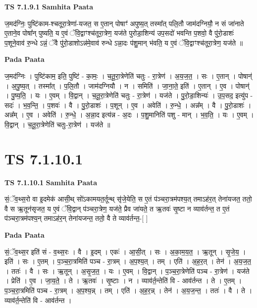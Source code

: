 \documentclass[17pt]{extarticle}
\begin{document}
\textbf{TS 7.1.9.1 } \newline
\textbf{Samhita Paata} \newline

ज॒मद॑ग्निः॒ पुष्टि॑काम-श्चतूरा॒त्रेणा॑-यजत॒ स ए॒तान् पोषाꣳ॑ अपुष्य॒त् तस्मा᳚त् पलि॒तौ जाम॑दग्नियौ॒ न सं जा॑नाते ए॒ताने॒व पोषा᳚न् पुष्यति॒ य ए॒वं ॅवि॒द्वाꣳश्च॑तूरा॒त्रेण॒ यज॑ते पुरोडा॒शिन्य॑ उप॒सदो॑ भवन्ति प॒शवो॒ वै पु॑रो॒डाशः॑ प॒शूने॒वाव॑ रु॒न्धे ऽन्नं॒ ॅवै पु॑रो॒डाशोऽन्न॑मे॒वाव॑ रुन्धे ऽन्ना॒दः प॑शु॒मान् भ॑वति॒ य ए॒वं ॅवि॒द्वाꣳश्च॑तूरा॒त्रेण॒ यज॑ते ॥ \newline

\textbf{Pada Paata} \newline

ज॒मद॑ग्निः । पुष्टि॑काम॒ इति॒ पुष्टि॑ - का॒मः॒ । च॒तू॒रा॒त्रेणेति॑ चतुः - रा॒त्रेण॑ । अ॒य॒ज॒त॒ । सः । ए॒तान् । पोषान्॑ । अ॒पु॒ष्य॒त् । तस्मा᳚त् । प॒लि॒तौ । जाम॑दग्नियौ । न । समिति॑ । जा॒ना॒ते॒ इति॑ । ए॒तान् । ए॒व । पोषान्॑ । पु॒ष्य॒ति॒ । यः । ए॒वम् । वि॒द्वान् । च॒तू॒रा॒त्रेणेति॑ चतुः - रा॒त्रेण॑ । यज॑ते । पु॒रो॒डा॒शिन्यः॑ । उ॒प॒सद॒ इत्यु॑प - सदः॑ । भ॒व॒न्ति॒ । प॒शवः॑ । वै । पु॒रो॒डाशः॑ । प॒शून् । ए॒व । अवेति॑ । रु॒न्धे॒ । अन्न᳚म् । वै । पु॒रो॒डाशः॑ । अन्न᳚म् । ए॒व । अवेति॑ । रु॒न्धे॒ । अ॒न्ना॒द इत्य॑न्न - अ॒दः । प॒शु॒मानिति॑ पशु - मान् । भ॒व॒ति॒ । यः । ए॒वम् । वि॒द्वान् । च॒तू॒रा॒त्रेणेति॑ चतुः-रा॒त्रेण॑ । यज॑ते ॥  \newline




\section*{ TS 7.1.10.1 }

\textbf{TS 7.1.10.1 } \newline
\textbf{Samhita Paata} \newline

सं॒ॅव॒थ्स॒रो वा इ॒दमेक॑ आसी॒थ् सो॑ऽकामयत॒र्तून्थ् सृ॑जे॒येति॒ स ए॒तं प॑ञ्चरा॒त्रम॑पश्य॒त् तमाऽह॑र॒त् तेना॑यजत॒ ततो॒ वै स ऋ॒तून॑सृजत॒ य ए॒वं ॅवि॒द्वान् प॑ञ्चरा॒त्रेण॒ यज॑ते॒ प्रैव जा॑यते॒ त ऋ॒तवः॑ सृ॒ष्टा न व्याव॑र्तन्त॒ त ए॒तं प॑ञ्चरा॒त्रम॑पश्य॒न् तमाऽह॑र॒न् तेना॑यजन्त॒ ततो॒ वै ते व्याव॑र्तन्त॒-[  ] \newline

\textbf{Pada Paata} \newline

सं॒ॅव॒थ्स॒र इति॑ सं - व॒थ्स॒रः । वै । इ॒दम् । एकः॑ । आ॒सी॒त् । सः । अ॒का॒म॒य॒त॒ । ऋ॒तून् । सृ॒जे॒य॒ । इति॑ । सः । ए॒तम् । प॒ञ्च॒रा॒त्रमिति॑ पञ्च - रा॒त्रम् । अ॒प॒श्य॒त् । तम् । एति॑ । अ॒ह॒र॒त् । तेन॑ । अ॒य॒ज॒त॒ । ततः॑ । वै । सः । ऋ॒तून् । अ॒सृ॒ज॒त॒ । यः । ए॒वम् । वि॒द्वान् । प॒ञ्च॒रा॒त्रेणेति॑ पञ्च - रा॒त्रेण॑ । यज॑ते । प्रेति॑ । ए॒व । जा॒य॒ते॒ । ते । ऋ॒तवः॑ । सृ॒ष्टाः । न । व्याव॑र्त॒न्तेति॑ वि - आव॑र्तन्त । ते । ए॒तम् । प॒ञ्च॒रा॒त्रमिति॑ पञ्च - रा॒त्रम् । अ॒प॒श्य॒न्न् । तम् । एति॑ । अ॒ह॒र॒न्न् । तेन॑ । अ॒य॒ज॒न्त॒ । ततः॑ । वै । ते । व्याव॑र्त॒न्तेति॑ वि - आव॑र्तन्त ।  \newline
\end{document}
